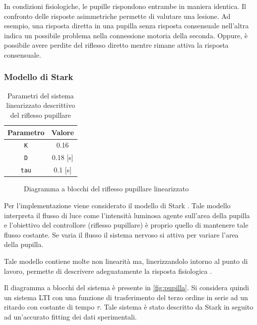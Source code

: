 In condizioni fisiologiche, le pupille rispondono entrambe in maniera identica. Il confronto delle risposte asimmetriche permette di valutare una lesione.
Ad esempio, una risposta diretta in una pupilla senza risposta consensuale nell'altra indica un possibile problema nella connessione motoria della seconda. Oppure, è possibile avere perdite del riflesso diretto mentre rimane attiva la risposta consensuale. 

\subsubsection{Modello di Stark}

\begin{table}[t!]
	\centering
	\begin{tabular}{|c|c|}
		\hline
		Parametro & Valore \\
		\hline
		\texttt{K} & 0.16 \\
		\hline
		\texttt{D} & 0.18 [s] \\
		\hline
		\texttt{tau} & 0.1 [s] \\
		\hline
	\end{tabular}
	\caption{Parametri del sistema linearizzato descrittivo del riflesso pupillare}
	\label{tab:pupilla}
\end{table}



\begin{figure}[t!]
	\centering
	\footnotesize{\def\svgwidth{0.95\linewidth}
		}
	\caption{Diagramma a blocchi del riflesso pupillare linearizzato}
	\label{fig:pupillary_block}
\end{figure}

Per l'implementazione viene considerato il modello di Stark \cite{stark_servoanalytic_1957}. Tale modello interpreta il flusso di luce come l'intensità luminosa agente sull'area della pupilla e l'obiettivo del controllore (riflesso pupillare) è proprio quello di mantenere tale flusso costante. Se varia il flusso il sistema nervoso si attiva per variare l'area della pupilla.

Tale modello contiene molte non linearità ma, linerizzandolo intorno al punto di lavoro, permette di descrivere adeguatamente la risposta fisiologica \cite{khoo_physiological_2018}.

Il diagramma a blocchi del sistema è presente in \cref{fig:pupilla}. Si considera quindi un sistema LTI con una funzione di trasferimento del terzo ordine in serie ad un ritardo con costante di tempo $\tau$. Tale sistema è stato descritto da Stark in seguito ad un'accurato fitting dei dati sperimentali.

